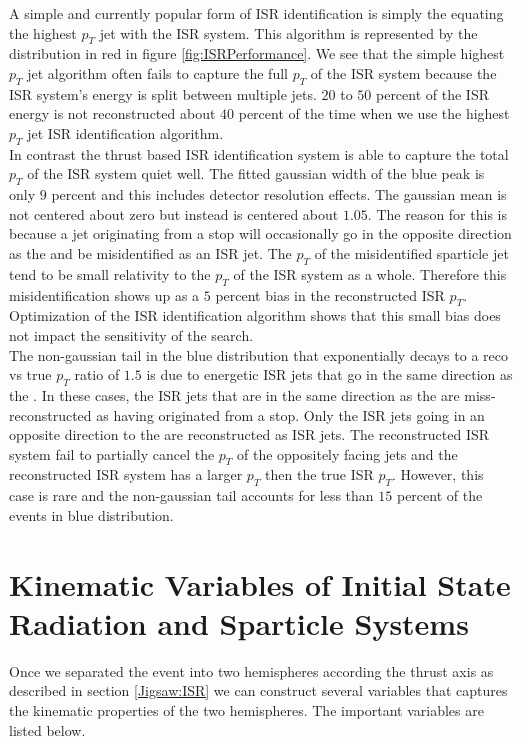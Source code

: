 A simple and currently popular form of ISR identification is simply the equating the highest $p_T$ jet with the ISR system. This algorithm is represented by the distribution in red in figure \ref{fig:ISRPerformance}.  We see that the simple highest $p_T$ jet algorithm often fails to capture the full $p_T$ of the ISR system because the ISR system's energy is split between multiple jets.  $20$ to $50$ percent of the ISR energy is not reconstructed about $40$ percent of the time when we use the highest $p_T$ jet ISR identification algorithm.\\

In contrast the thrust based ISR identification system is able to capture the total $p_T$ of the ISR system quiet well.  The fitted gaussian width of the blue peak is only $9$ percent and this includes detector resolution effects.  The gaussian mean is not centered about zero but instead is centered about $1.05$.  The reason for this is because a jet originating from a stop will occasionally go in the opposite direction as the \met and be misidentified as an ISR jet.  The $p_T$ of the misidentified sparticle jet tend to be small relativity to the $p_T$ of the ISR system as a whole.  Therefore this misidentification shows up as a $5$ percent bias in the reconstructed ISR $p_T$.  Optimization of the ISR identification algorithm shows that this small bias does not impact the sensitivity of the search.  \\

The non-gaussian tail in the blue distribution that exponentially decays to a reco vs true $p_T$ ratio of $1.5$ is due to energetic ISR jets that go in the same direction as the \MET.  In these cases, the ISR jets that are in the same direction as the \met are miss-reconstructed as having originated from a stop.  Only the ISR jets going in an opposite direction to the \MET are reconstructed as ISR jets.  The reconstructed ISR system fail to partially cancel the $p_T$ of the oppositely facing jets and the reconstructed ISR system has a larger $p_T$ then the true ISR $p_T$.  However, this case is rare and the non-gaussian tail accounts for less than $15$ percent of the events in blue distribution.

\section{Kinematic Variables of Initial State Radiation and Sparticle Systems}
\label{Jigsaw:Variables}

Once we separated the event into two hemispheres according the thrust axis as described in section \ref{Jigsaw:ISR} we can construct several variables that captures the kinematic properties of the two hemispheres.  The important variables are listed below.

